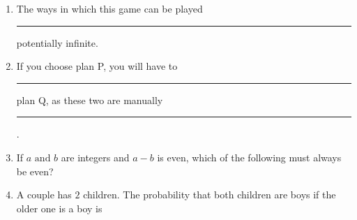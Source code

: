 \documentclass[journal,12pt,onecolumn]{IEEEtran}
\theoremstyle{remark}
\begin{document}
\begin{enumerate}
    \item The ways in which this game can be played \rule{3cm}{0.15mm} potentially infinite.  \hfill{}
                \begin{enumerate}
                \end{enumerate}
    \item If you choose plan P, you will have to \rule{3cm}{0.15mm} plan Q, as these two are manually \rule{3cm}{0.15mm}. \hfill{}
                \begin{enumerate}
                \end{enumerate}
    \item If $a \text{ and } b $ are integers and $a-b$ is even, which of the following must always be even? \hfill{}
                \begin{enumerate}
                \end{enumerate}
    \item A couple has $2$ children. The probability that both children are boys if the older one is a boy is  \hfill{}

\end{enumerate}
\end{document}
